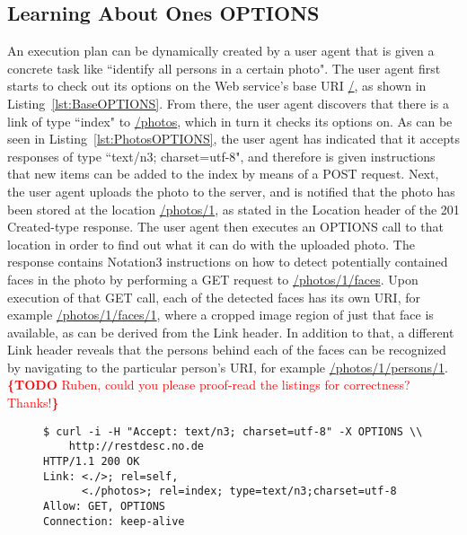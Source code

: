 \documentclass[runningheads,a4paper, twocolumn]{llncs}
\newcommand{\todo}[1]{\noindent\textcolor{red}{{\bf \{TODO} #1{\bf \}}}}
\begin{document}
\subsection{Learning About Ones OPTIONS} \label{MainStory}
An execution plan can be dynamically created by a user agent that is given a concrete task like ``identify all persons in a certain photo". The user agent first starts to check out its options on the Web service's base URI \url{/}, as shown in Listing~\ref{lst:BaseOPTIONS}. From there, the user agent discovers that there is a link of type ``index" to \url{/photos}, which in turn it checks its options on. As can be seen in Listing~\ref{lst:PhotosOPTIONS}, the user agent has indicated that it accepts responses of type ``text/n3; charset=utf-8", and therefore is given instructions that new items can be added to the index by means of a POST request. Next, the user agent uploads the photo to the server, and is notified that the photo has been stored at the location \url{/photos/1}, as stated in the Location header of the 201 Created-type response. The user agent then executes an OPTIONS call to that location in order to find out what it can do with the uploaded photo. The response contains Notation3 instructions on how to detect potentially contained faces in the photo by performing a GET request to \url{/photos/1/faces}.  Upon execution of that GET call, each of the detected faces has its own URI, for example \url{/photos/1/faces/1}, where a cropped image region of just that face is available, as can be derived from the Link header. In addition to that, a different Link header reveals that the persons behind each of the faces can be recognized by navigating to the particular person's URI, for example \url{/photos/1/persons/1}.
\todo{Ruben, could you please proof-read the listings for correctness? Thanks!}
\begin{figure}[float=t!]
\begin{lstlisting}[caption=Listing showing an OPTIONS call on an API's base URI., label=lst:BaseOPTIONS, escapechar=§]
$ curl -i -H "Accept: text/n3; charset=utf-8" -X OPTIONS \\
    http://restdesc.no.de
HTTP/1.1 200 OK
Link: <./>; rel=self,
      <./photos>; rel=index; type=text/n3;charset=utf-8
Allow: GET, OPTIONS      
Connection: keep-alive
\end{lstlisting}
\end{figure}
\end{document}
